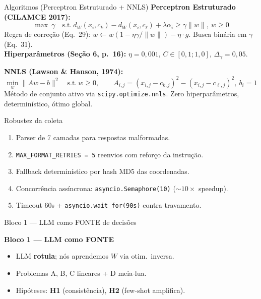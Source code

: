 \documentclass[aspectratio=169,10pt]{beamer}
\begin{document}
\begin{frame}{Algoritmos (Perceptron Estruturado + NNLS)}
  \scriptsize
  \textbf{Perceptron Estruturado (CILAMCE 2017):}
  \[ \max\ \gamma \quad \text{s.t.}\ d_W(x_i,c_k) - d_W(x_i,c_\ell) + \lambda\alpha_i \geq \gamma\|w\|,\ w \geq 0 \]
  Regra de corre\c{c}\~ao (Eq.\ 29): $w \leftarrow w(1 - \eta\gamma/\|w\|) - \eta\cdot g$. Busca bin\'aria em $\gamma$ (Eq.\ 31).\\
  \textbf{Hiperpar\^ametros (Se\c{c}\~ao 6, p.\ 16):} $\eta=0{,}001$, $C \in [0{,}1; 1{,}0]$, $\Delta_\gamma=0{,}05$.
  \medskip

  \textbf{NNLS (Lawson \& Hanson, 1974):}
  \[ \min_w \|Aw - b\|^2 \quad \text{s.t.}\ w \geq 0, \qquad A_{i,j} = (x_{i,j} - c_{k,j})^2 - (x_{i,j} - c_{\ell,j})^2,\ b_i = 1 \]
  M\'etodo de conjunto ativo via \texttt{scipy.optimize.nnls}. Zero hiperpar\^ametros, determin\'istico, \'otimo global.
\end{frame}

\begin{frame}{Robustez da coleta}
  \footnotesize
  \begin{enumerate}
    \item Parser de 7 camadas para respostas malformadas.
    \item \texttt{MAX\_FORMAT\_RETRIES = 5} reenvios com refor\c{c}o da instru\c{c}\~ao.
    \item Fallback determin\'istico por hash MD5 das coordenadas.
    \item Concorr\^encia ass\'incrona: \texttt{asyncio.Semaphore(10)} ($\sim 10\times$ speedup).
    \item Timeout 60s + \texttt{asyncio.wait\_for(90s)} contra travamento.
  \end{enumerate}
\end{frame}

\begin{frame}{Bloco 1 --- LLM como FONTE de decis\~oes}
  \footnotesize
  \begin{center}\Large\textbf{Bloco 1 --- LLM como FONTE}\end{center}
  \medskip
  \begin{itemize}
    \item LLM \textbf{rotula}; n\'os aprendemos $W$ via otim.\ inversa.
    \item Problemas A, B, C lineares + D meia-lua.
    \item Hip\'oteses: \textbf{H1} (consist\^encia), \textbf{H2} (few-shot amplifica).
  \end{itemize}
\end{frame}
\end{document}
